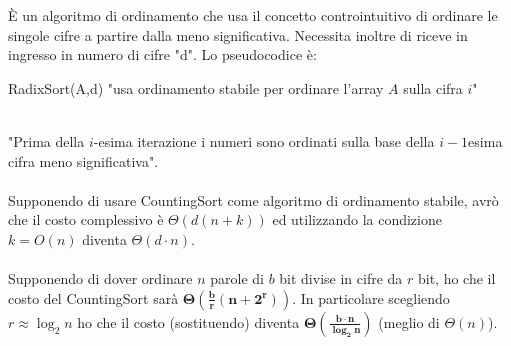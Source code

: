 \documentclass[8pt]{extarticle}
\begin{document}
\begin{formulario}
		\begin{tcenter}
		\end{tcenter}
È un algoritmo di ordinamento che usa il concetto controintuitivo di ordinare le singole cifre a partire dalla meno significativa. Necessita inoltre di riceve in ingresso in numero di cifre "d". Lo pseudocodice è: 
		\begin{code}{RadixSort(A,d)}
\li {}
	\li "usa ordinamento stabile per ordinare l'array $A$ sulla cifra $i$"
\End
		\end{code}
\\
"Prima della $i$-esima iterazione i numeri sono ordinati sulla base della $i-1$esima cifra meno significativa". \\
\\
Supponendo di usare CountingSort come algoritmo di ordinamento stabile, avrò che il costo complessivo è $\Theta(d(n+k))$ ed utilizzando la condizione $k=O(n)$ diventa $\Theta(d\cdot n)$. \\
 \\
Supponendo di dover ordinare $n$ parole di $b$ bit divise in cifre da $r$ bit, ho che il costo del CountingSort sarà $\bm{\Theta(\frac{b}{r}(n+2^r))}$. In particolare scegliendo $r\approx\log_2n$ ho che il costo (sostituendo) diventa $\bm{\Theta(\frac{b\cdot n}{\log_2n})}$ (meglio di $\Theta(n)$).
\myRule


\end{formulario}
\end{document}
